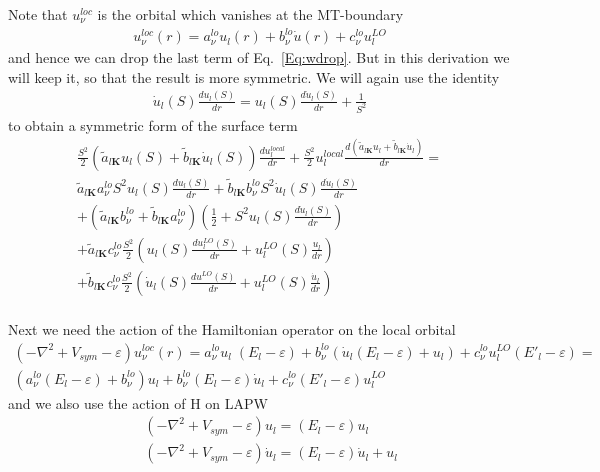 \documentclass[aps,prb,floatfix,epsfig,singlecolumn,showpacs,preprintnumbers]{revtex4}
\newcommand{\vK}{{\mathbf{K}}}
\begin{document}
Note that $u^{loc}_\nu$ is the orbital which vanishes at the MT-boundary
\begin{eqnarray}
u^{loc}_\nu(r) = a^{lo}_\nu u_l(r) + b^{lo}_\nu \dot{u}(r) + c^{lo}_\nu u_l^{LO}
\end{eqnarray}
and hence we can drop the last term of Eq.~\ref{Eq:wdrop}.
But in this derivation we will keep it, so that the result is more
symmetric. We will again use the identity
\begin{eqnarray}
\dot{u}_l(S)\frac{d u_l(S)}{dr}= u_l(S) \frac{d \dot{u}_l(S)}{dr} + \frac{1}{S^2}
\end{eqnarray}
to obtain a symmetric form of the surface term
\begin{eqnarray}
\frac{S^2}{2}(\tilde{a}_{l\vK} u_l(S) + \tilde{b}_{l\vK} \dot{u}_l(S))\frac{d u^{local}_l}{dr}
+\frac{S^2}{2}u^{local}_l\frac{d (\tilde{a}_{l\vK}  u_l+\tilde{b}_{l\vK}  \dot{u}_l)}{dr}=\\
 \tilde{a}_{l\vK} a_\nu^{lo} {S^2}u_l(S)\frac{du_l(S)}{dr} +\tilde{b}_{l\vK}  b_\nu^{lo} {S^2} \dot{u}_l(S)\frac{d\dot{u}_l(S)}{dr} \\
+( \tilde{a}_{l\vK} b_\nu^{lo} + \tilde{b}_{l\vK} a_\nu^{lo})(  \frac{1}{2} + S^2 u_l(S)\frac{d\dot{u}_l(S)}{dr})\\
+\tilde{a}_{l\vK} c_\nu^{lo} \frac{S^2}{2} (u_l(S)\frac{du_l^{LO}(S)}{dr}+u^{LO}_l(S)\frac{u_l}{dr})\\
+\tilde{b}_{l\vK} c_\nu^{lo} \frac{S^2}{2} (\dot{u}_l(S)\frac{du^{LO}(S)}{dr}+u^{LO}_l(S) \frac{\dot{u}_l}{dr} )\\
\end{eqnarray}



Next we need the action of the Hamiltonian operator on the local orbital
\begin{eqnarray}
(-\nabla^2+V_{sym}-\varepsilon) u^{loc}_\nu(r) = 
 a^{lo}_\nu u_l \; (E_l-\varepsilon)
+  b^{lo}_\nu (\dot{u}_l  (E_l-\varepsilon) + u_l) 
+ c^{lo}_\nu u^{LO}_l  (E'_l-\varepsilon)
=\\
 (a^{lo}_\nu (E_l-\varepsilon)+b^{lo}_\nu) u_l + 
b^{lo}_\nu (E_l-\varepsilon) \dot{u}_l + c^{lo}_\nu (E'_l-\varepsilon)  u^{LO}_l
\end{eqnarray}
and we also use the action of H on LAPW
\begin{eqnarray}
&& (-\nabla^2+V_{sym}-\varepsilon) u_l =  (E_l-\varepsilon) u_l\\
&& (-\nabla^2+V_{sym}-\varepsilon)\dot{u}_l=(E_l-\varepsilon) \dot{u}_l+ u_l
\end{eqnarray}
\end{document}
